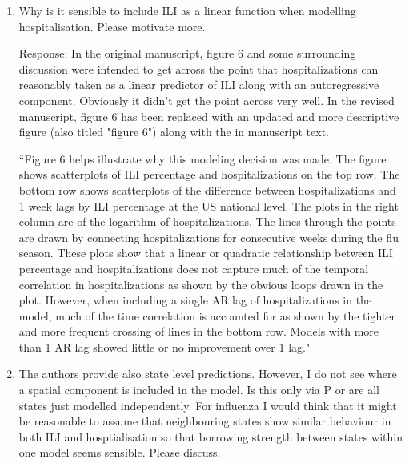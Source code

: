 \documentclass{article}
\newcommand{\spencer}[1]{{\color{red} Response: #1}}
\begin{document}
\begin{enumerate}[1.]
\spencer{In the revised manuscript, 
both the simulation study and the real data analysis were updated to include
comparison of our models to others. In the simulation study, we included out 
of the box methods including an ARIMA model and a random walk baseline model
(similar to the baseline used in the FluSight competition).
In the real data analysis, our model forecasts are compared to those of 20
non-ensemble models submitted to the FluSight competition during the 2023-24
season. In both the simulation study and the real data analysis, 
our models show very good performance when compared to the other models. 
The original real data analysis where we compare several models that
belong to our framework is now in the supplementary materials.}

\item Why is it sensible to include ILI as a linear function when modelling 
hospitalisation. Please motivate more. 

\spencer{In the original manuscript, figure 6 and some surrounding discussion
were intended to get across the point that hospitalizations can reasonably
taken as a linear predictor of ILI along with an autoregressive component.
Obviously it didn't get the point across very well. 
In the revised manuscript, figure 6 has been replaced with an updated and more
descriptive figure (also titled "figure 6") along with the in manuscript
text.

``Figure 6 helps
illustrate why this modeling decision was made.
The figure shows scatterplots of ILI percentage and 
hospitalizations on the top row.
The bottom row shows scatterplots of the difference between hospitalizations and 
1 week 
lags
by ILI percentage at the US national level. The plots in the right column
are of the logarithm of hospitalizations. The lines through the points are
drawn by connecting hospitalizations for consecutive weeks during the flu 
season.
These plots show that a linear or quadratic relationship between ILI percentage 
and hospitalizations does not capture much of the temporal correlation in 
hospitalizations as shown by the obvious loops drawn in the plot. 
However, when including a 
single AR lag of hospitalizations in the model, much of the time 
correlation is
accounted for as shown by the tighter and more frequent crossing of lines
in the bottom row. Models with more than 1 AR lag showed little or no 
improvement over 1 lag."}

\item The authors provide also state level predictions. However, I do not see 
where a spatial component is included in the model. Is this only via P or are 
all states just modelled independently. For influenza I would think that it 
might be reasonable to assume that neighbouring states show similar behaviour 
in both ILI and hosptialisation so that borrowing strength between states 
within one model seems sensible. Please discuss.



\end{enumerate}
\end{document}
